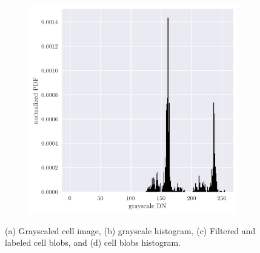 \documentclass[12pt,a4paper]{article}
\begin{document}
\begin{figure}[htb]
\begin{subfigure}[h!]{0.49\textwidth}
		\caption{}
		\label{fig:cell-blobs}
	\end{subfigure}
	\begin{subfigure}[h!]{0.49\textwidth}
		\centering
		\includegraphics[width=\textwidth]{blobs_hist.png}
		\caption{}
		\label{fig:blobs-hist}
	\end{subfigure}
	\caption{(a) Grayscaled cell image, (b) grayscale histogram, (c) Filtered and labeled cell blobs, and (d) cell blobs histogram.}
	\label{fig:cell}
\end{figure}
\end{document}
